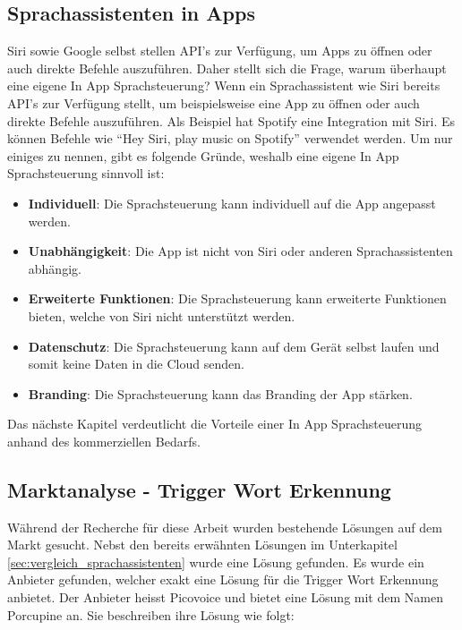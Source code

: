 \documentclass[11pt,a4paper]{article}
\begin{document}
\subsection{Sprachassistenten in Apps} 
Siri sowie Google selbst stellen API's zur Verfügung, um Apps zu öffnen oder auch direkte Befehle
auszuführen. Daher stellt sich die Frage, warum überhaupt eine eigene In App Sprachsteuerung? Wenn
ein Sprachassistent wie Siri bereits API's zur Verfügung stellt, um beispielsweise eine App
zu öffnen oder auch direkte Befehle auszuführen. Als Beispiel hat Spotify eine Integration mit Siri.
Es können Befehle wie ``Hey Siri, play music on Spotify'' verwendet werden. Um nur einiges zu
nennen, gibt es folgende Gründe, weshalb eine eigene In App Sprachsteuerung sinnvoll ist:

\begin{itemize}
	\item \textbf{Individuell}: Die Sprachsteuerung kann individuell auf die App angepasst werden.
	\item \textbf{Unabhängigkeit}: Die App ist nicht von Siri oder anderen Sprachassistenten
	      abhängig.
	\item \textbf{Erweiterte Funktionen}: Die Sprachsteuerung kann erweiterte Funktionen bieten,
	      welche von Siri nicht unterstützt werden.
	\item \textbf{Datenschutz}: Die Sprachsteuerung kann auf dem Gerät selbst laufen und somit
	      keine Daten in die Cloud senden.
	\item \textbf{Branding}: Die Sprachsteuerung kann das Branding der App stärken.
\end{itemize}

\noindent \newline
Das nächste Kapitel verdeutlicht die Vorteile einer In App Sprachsteuerung anhand des kommerziellen
Bedarfs.

\subsection{Marktanalyse - Trigger Wort Erkennung}
Während der Recherche für diese Arbeit wurden bestehende Lösungen auf dem Markt gesucht. Nebst den 
bereits erwähnten Lösungen im Unterkapitel \ref{sec:vergleich_sprachassistenten} wurde eine Lösung 
gefunden. Es wurde ein Anbieter gefunden, welcher exakt eine Lösung für die Trigger Wort Erkennung 
anbietet. Der Anbieter heisst Picovoice und bietet eine Lösung mit dem Namen Porcupine an. Sie 
beschreiben ihre Lösung wie folgt:
\end{document}
